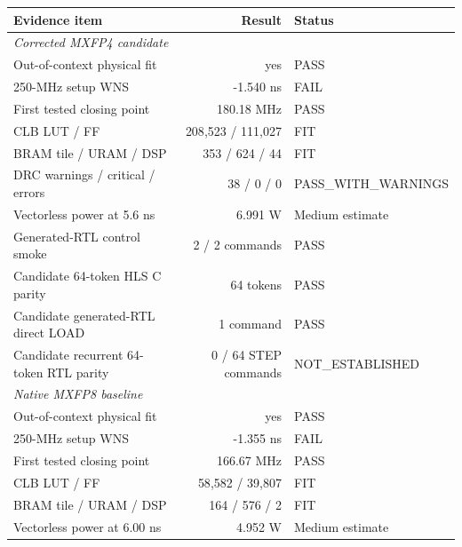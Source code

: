 \begin{tabular}{lrl}
\toprule
Evidence item & Result & Status \\
\midrule
\multicolumn{3}{l}{\textit{Corrected MXFP4 candidate}} \\
Out-of-context physical fit & yes & PASS \\
250-MHz setup WNS & -1.540 ns & FAIL \\
First tested closing point & 180.18 MHz & PASS \\
CLB LUT / FF & 208{,}523 / 111{,}027 & FIT \\
BRAM tile / URAM / DSP & 353 / 624 / 44 & FIT \\
DRC warnings / critical / errors & 38 / 0 / 0 & PASS\_WITH\_WARNINGS \\
Vectorless power at 5.6 ns & 6.991 W & Medium estimate \\
Generated-RTL control smoke & 2 / 2 commands & PASS \\
Candidate 64-token HLS C parity & 64 tokens & PASS \\
Candidate generated-RTL direct LOAD & 1 command & PASS \\
Candidate recurrent 64-token RTL parity & 0 / 64 STEP commands & NOT\_ESTABLISHED \\
\midrule
\multicolumn{3}{l}{\textit{Native MXFP8 baseline}} \\
Out-of-context physical fit & yes & PASS \\
250-MHz setup WNS & -1.355 ns & FAIL \\
First tested closing point & 166.67 MHz & PASS \\
CLB LUT / FF & 58{,}582 / 39{,}807 & FIT \\
BRAM tile / URAM / DSP & 164 / 576 / 2 & FIT \\
Vectorless power at 6.00 ns & 4.952 W & Medium estimate \\
\bottomrule
\end{tabular}

